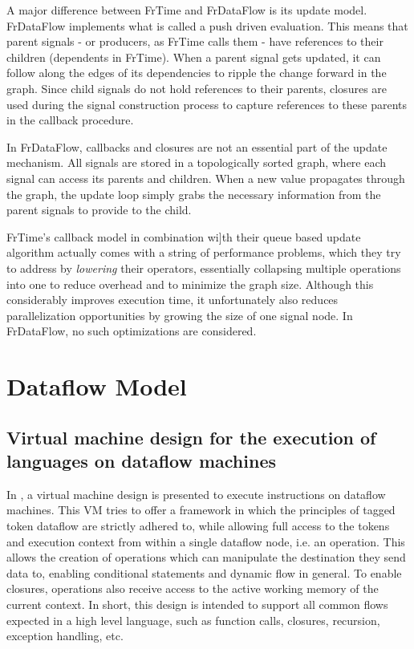 A major difference between FrTime and FrDataFlow is its update model. FrDataFlow implements what is called a push driven evaluation. This means that parent signals - or producers, as FrTime calls them - have references to their children (dependents in FrTime). When a parent signal gets updated, it can follow along the edges of its dependencies to ripple the change forward in the graph. Since child signals do not hold references to their parents, closures are used during the signal construction process to capture references to these parents in the callback procedure.

In FrDataFlow, callbacks and closures are not an essential part of the update mechanism. All signals are stored in a topologically sorted graph, where each signal can access its parents and children. When a new value propagates through the graph, the update loop simply grabs the necessary information from the parent signals to provide to the child.

FrTime's callback model in combination wi]th their queue based update algorithm actually comes with a string of performance problems, which they try to address by \textit{lowering} \cite{burchett_lowering:_2007} their operators, essentially collapsing multiple operations into one to reduce overhead and to minimize the graph size. Although this considerably improves execution time, it unfortunately also reduces parallelization opportunities by growing the size of one signal node. In FrDataFlow, no such optimizations are considered. 

\section{Dataflow Model}

\subsection{Virtual machine design for the execution of languages on dataflow machines}

In \cite{saey_extensible_2017}, a virtual machine design is presented to execute instructions on dataflow machines. This VM tries to offer a framework in which the principles of tagged token dataflow are strictly adhered to, while allowing full access to the tokens and execution context from within a single dataflow node, i.e. an operation. This allows the creation of operations which can manipulate the destination they send data to, enabling conditional statements and dynamic flow in general. To enable closures, operations also receive access to the active working memory of the current context. 
In short, this design is intended to support all common flows expected in a high level language, such as function calls, closures, recursion, exception handling, etc.

